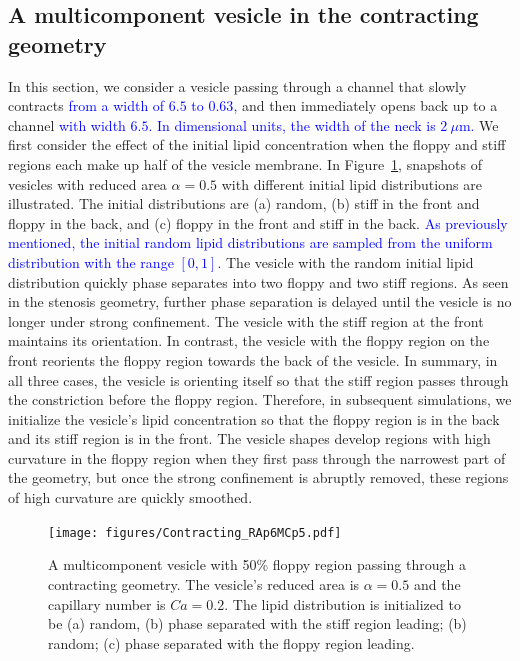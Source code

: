 \documentclass[twoside,twocolumn,9pt]{article}
\begin{document}
\subsection{\label{subsec:Contraction} A multicomponent vesicle in the
contracting geometry}
In this section, we consider a vesicle passing through a channel that
slowly contracts 
\textcolor{blue}{
from a width of $6.5$ to $0.63$,
}
and then immediately opens back up to a channel 
\textcolor{blue}{
with width $6.5$. In dimensional units, the width of the neck is
$2~\mu$m.
}
We first consider the effect of the initial lipid concentration when the
floppy and stiff regions each make up half of the vesicle membrane. In
Figure~\ref{fig:RA6leftRightRand}, snapshots of vesicles with reduced
area $\alpha = 0.5$ with different initial lipid distributions are
illustrated. The initial distributions are (a) random, (b) stiff in the
front and floppy in the back, and (c) floppy in the front and stiff in
the back. 
\textcolor{blue}{
As previously mentioned, the initial random lipid distributions are
sampled from the uniform distribution with the range $[0,1]$.}
The vesicle with the random initial lipid distribution quickly
phase separates into two floppy and two stiff regions. As seen in the
stenosis geometry, further phase separation is delayed until the vesicle
is no longer under strong confinement. The vesicle with the stiff region
at the front maintains its orientation. In contrast, the vesicle with
the floppy region on the front reorients the floppy region towards the
back of the vesicle. In summary, in all three cases, the vesicle is
orienting itself so that the stiff region passes through the
constriction before the floppy region. Therefore, in subsequent
simulations, we initialize the vesicle's lipid concentration so that the
floppy region is in the back and its stiff region is in the front. The
vesicle shapes develop regions with high curvature in the floppy region
when they first pass through the narrowest part of the geometry, but
once the strong confinement is abruptly removed, these regions of high
curvature are quickly smoothed.

\begin{figure}[h]
  \centering
  \texttt{[image: figures/Contracting\_RAp6MCp5.pdf]}
  \caption{\label{fig:RA6leftRightRand} \small A multicomponent vesicle
  with 50\% floppy region passing through a contracting geometry. The
  vesicle's reduced area is $\alpha = 0.5$ and the capillary number is
  $Ca = 0.2$. The lipid distribution is initialized to be (a) random,
  (b) phase separated with the stiff region leading; (b) random; (c)
  phase separated with the floppy region leading.}
\end{figure}
\end{document}
